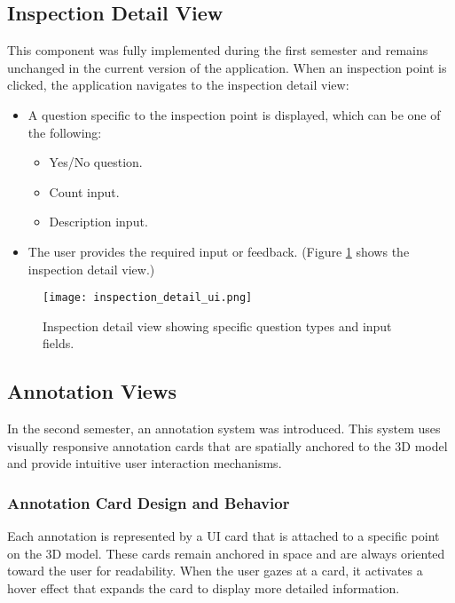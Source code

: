 \subsection{Inspection Detail View}
This component was fully implemented during the first semester and remains unchanged in the current version of the application. When an inspection point is clicked, the application navigates to the inspection detail view:
\begin{itemize}
    \item A question specific to the inspection point is displayed, which can be one of the following:
    \begin{itemize}
        \item Yes/No question.
        \item Count input.
        \item Description input.
    \end{itemize}
    \item The user provides the required input or feedback. (Figure \ref{fig:ui_inspection_detail} shows the inspection detail view.)
\end{itemize}


\begin{figure}[H]
    \centering
    \texttt{[image: inspection\_detail\_ui.png]} %
    \caption{Inspection detail view showing specific question types and input fields.}
    \label{fig:ui_inspection_detail}
\end{figure}

\subsection{Annotation Views}

In the second semester, an annotation system was introduced. This system uses visually responsive annotation cards that are spatially anchored to the 3D model and provide intuitive user interaction mechanisms.

\subsubsection{Annotation Card Design and Behavior}

Each annotation is represented by a UI card that is attached to a specific point on the 3D model. These cards remain anchored in space and are always oriented toward the user for readability. When the user gazes at a card, it activates a hover effect that expands the card to display more detailed information.

